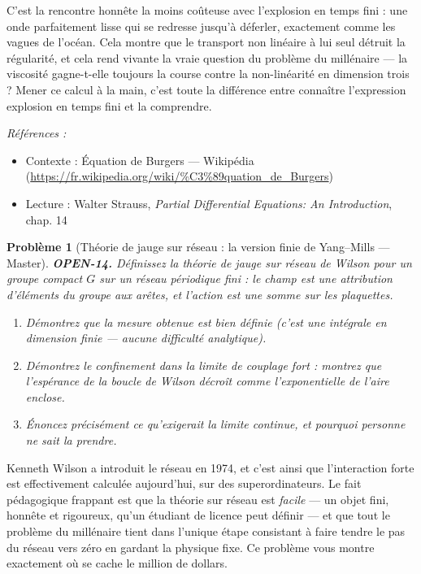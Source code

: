 \documentclass[11pt]{article}
\newtheorem{problem}{Problème}
\newenvironment{refs}{\par\small\noindent\emph{Références :}\begin{itemize}\setlength\itemsep{0pt}}{\end{itemize}\normalsize}
\begin{document}
\noindent C'est la rencontre honnête la moins coûteuse avec l'explosion en temps
fini : une onde parfaitement lisse qui se redresse jusqu'à déferler, exactement comme les
vagues de l'océan. Cela montre que le transport non linéaire à lui seul détruit la
régularité, et cela rend vivante la vraie question du problème du millénaire --- la
viscosité gagne-t-elle toujours la course contre la non-linéarité en dimension trois ?
Mener ce calcul à la main, c'est toute la différence entre connaître l'expression
\og{} explosion en temps fini \fg{} et la comprendre.

\begin{refs}
\item Contexte : Équation de Burgers --- Wikipédia (\url{https://fr.wikipedia.org/wiki/%C3%89quation_de_Burgers})
\item Lecture : Walter Strauss, \textit{Partial Differential Equations: An Introduction}, chap. 14
\end{refs}

\bigskip

\begin{problem}[{Théorie de jauge sur réseau : la version finie de Yang--Mills --- Master}]
\textbf{OPEN-14.} Définissez la théorie de jauge sur réseau de Wilson pour un groupe
compact $ G $ sur un réseau périodique fini : le champ est une attribution d'éléments du
groupe aux arêtes, et l'action est une somme sur les plaquettes.
\begin{enumerate}
\item[(a)] Démontrez que la mesure obtenue est bien définie (c'est une intégrale en dimension
finie --- aucune difficulté analytique).
\item[(b)] Démontrez le confinement dans la limite de couplage fort : montrez que l'espérance de
la boucle de Wilson décroît comme l'exponentielle de l'aire enclose.
\item[(c)] Énoncez précisément ce qu'exigerait la limite continue, et pourquoi personne ne sait
la prendre.
\end{enumerate}

\end{problem}

\noindent Kenneth Wilson a introduit le réseau en 1974, et c'est ainsi que
l'interaction forte est effectivement calculée aujourd'hui, sur des superordinateurs. Le
fait pédagogique frappant est que la théorie sur réseau est \textit{facile} --- un objet fini,
honnête et rigoureux, qu'un étudiant de licence peut définir --- et que tout le problème du
millénaire tient dans l'unique étape consistant à faire tendre le pas du réseau vers zéro
en gardant la physique fixe. Ce problème vous montre exactement où se cache le million de
dollars.
\end{document}
